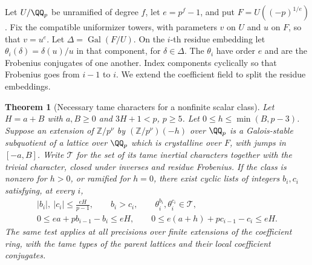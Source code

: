 \documentclass[a4paper,11pt]{article}
\newtheorem{theorem}[proposition]{Theorem}
\theoremstyle{definition}
\theoremstyle{remark}
\newcommand{\ZZ}{\mathbb Z}\newcommand{\ord}{\operatorname{ord}}
\numberwithin{equation}{section}
\begin{document}
Let \(U/\QQ_p\) be unramified of degree \(f\), let \(e=p^f-1\),
and put \(F=U((-p)^{1/e})\). Fix the compatible uniformizer
towers, with parameters \(v\) on \(U\) and \(u\) on \(F\), so
that \(v=u^e\). Let \(\Delta=\operatorname{Gal}(F/U)\).
On the \(i\)-th residue embedding let
\(\theta_i(\delta)=\delta(u)/u\) in that component, for
\(\delta\in\Delta\). The \(\theta_i\) have order \(e\) and
are the Frobenius conjugates of one another. Index components
cyclically so that Frobenius goes from \(i-1\) to \(i\).
We extend the coefficient field to split the residue embeddings.

\begin{theorem}[Necessary tame characters for a nonfinite scalar class]
\leavevmode\label{thm:tameorder753}
Let \(H=a+B\) with \(a,B\ge0\) and \(3H+1<p\), \(p\ge5\).
Let \(0\le h\le\min(B,p-3)\).
Suppose an extension of \(\ZZ/p^\nu\) by \((\ZZ/p^\nu)(-h)\)
over \(\QQ_p\) is a Galois-stable subquotient of a lattice over
\(\QQ_p\) which is crystalline over \(F\), with jumps in
\([-a,B]\). Write \(\mathcal T\) for the set of its tame
inertial characters together with the trivial character, closed
under inverses and residue Frobenius. If the class is nonzero
for \(h>0\), or ramified for \(h=0\), there exist cyclic lists
of integers \(b_i,c_i\) satisfying, at every \(i\),
\[
\begin{gathered}
 |b_i|,\ |c_i|\le\frac{eH}{p-1},\qquad b_i>c_i,\qquad
       \theta_i^{b_i},\theta_i^{c_i}\in\mathcal T,\\
 0\le ea+p b_{i-1}-b_i\le eH,\qquad
 0\le e(a+h)+p c_{i-1}-c_i\le eH .
\end{gathered}
\]
The same test applies at all precisions over finite extensions
of the coefficient ring, with the tame types of the parent
lattices and their local coefficient conjugates.
\end{theorem}
\end{document}
